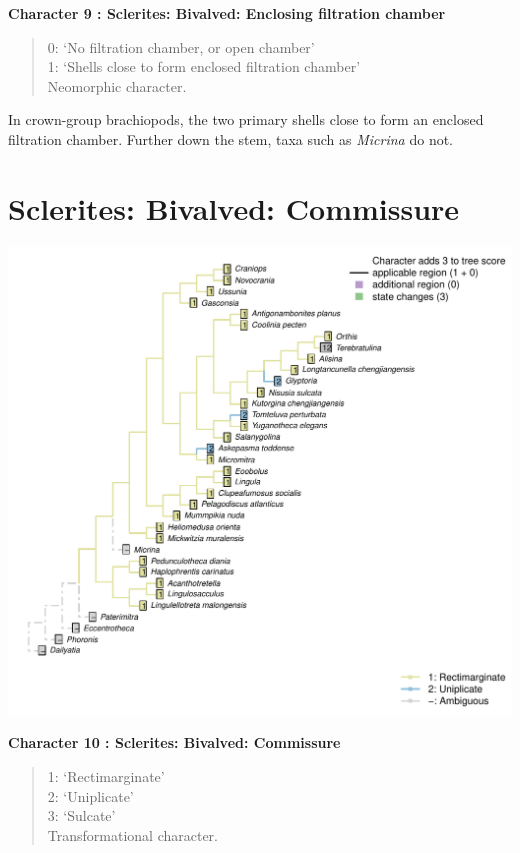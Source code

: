 \documentclass[]{book}
\theoremstyle{definition}
\theoremstyle{definition}
\theoremstyle{definition}
\theoremstyle{remark}
\begin{document}
\textbf{Character 9 : Sclerites: Bivalved: Enclosing filtration chamber
}

\begin{quote}
0: `No filtration chamber, or open chamber'\\
1: `Shells close to form enclosed filtration chamber'\\
Neomorphic character.
\end{quote}

In crown-group brachiopods, the two primary shells close to form an
enclosed filtration chamber. Further down the stem, taxa such as
\emph{Micrina} do not.

\hypertarget{sclerites-bivalved-commissure}{%
\section*{Sclerites: Bivalved:
Commissure}\label{sclerites-bivalved-commissure}}

\includegraphics{Brachiopod_phylogeny_files/figure-latex/unnamed-chunk-5-10.pdf}

\textbf{Character 10 : Sclerites: Bivalved: Commissure }

\begin{quote}
1: `Rectimarginate'\\
2: `Uniplicate'\\
3: `Sulcate'\\
Transformational character.
\end{quote}
\end{document}
